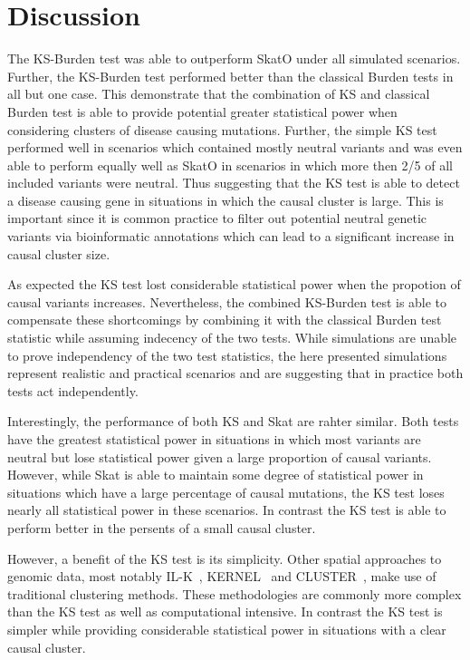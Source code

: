 \section{Discussion}
\label{sec:discussion_ks}

The KS-Burden test was able to outperform SkatO under all simulated scenarios.
Further, the KS-Burden test performed better than the classical Burden tests in all but one case.
This demonstrate that the combination of KS and classical Burden test is able to provide potential greater statistical power when considering clusters of disease causing mutations.
Further, the simple KS test performed well in scenarios which contained mostly neutral variants and was even able to perform equally well as SkatO in scenarios in which more then 2/5 of all included variants were neutral.
Thus suggesting that the KS test is able to detect a disease causing gene in situations in which the causal cluster is large.
This is important since it is common practice to filter out potential neutral genetic variants via bioinformatic annotations which can lead to a significant increase in causal cluster size.

As expected the KS test lost considerable statistical power when the propotion of causal variants increases.
Nevertheless, the combined KS-Burden test is able to compensate these shortcomings by combining it with the classical Burden test statistic while assuming indecency of the two tests.
While simulations are unable to prove independency of the two test statistics, the here presented simulations represent realistic and practical scenarios and are suggesting that in practice both tests act independently.

Interestingly, the performance of both KS and Skat are rahter similar.
Both tests have the greatest statistical power in situations in which most variants are neutral but lose statistical power given a large proportion of causal variants.
However, while Skat is able to maintain some degree of statistical power in situations which have a large percentage of causal mutations, the KS test loses nearly all statistical power in these scenarios.
In contrast the KS test is able to perform better in the persents of a small causal cluster.

However, a benefit of the KS test is its simplicity.
Other spatial approaches to genomic data, most notably IL-K~\cite{Ionita-Laza2012}, KERNEL~\cite{Schaid2013} and CLUSTER~\cite{Lin2014}, make use of traditional clustering methods.
These methodologies are commonly more complex than the KS test as well as computational intensive.
In contrast the KS test is simpler while providing considerable statistical power in situations with a clear causal cluster.

